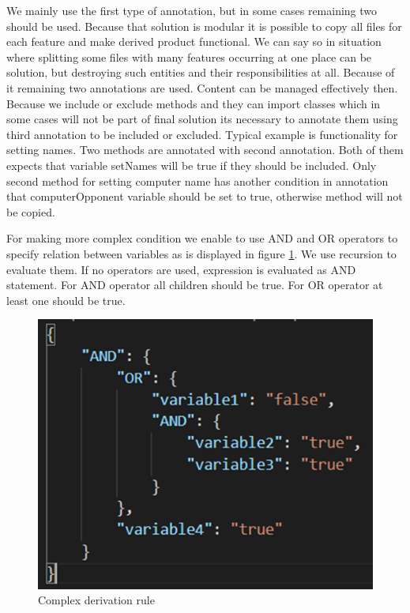 \documentclass[11pt,english,a4paper,twoside]{article}
\begin{document}
We mainly use the first type of annotation, but in some cases remaining two should be used. Because that solution is modular it is possible to copy all files for each feature and make derived product functional. We can say so in situation where splitting some files with many features occurring at one place can be solution, but destroying such entities and their responsibilities at all. Because of it remaining two annotations are used. Content can be managed effectively then. Because we include or exclude methods and they can import classes which in some cases will not be part of final solution its necessary to annotate them using third annotation to be included or excluded. Typical example is functionality for setting names. Two methods are annotated with second annotation. Both of them expects that variable setNames will be true if they should be included. Only second method for setting computer name has another condition in annotation that computerOpponent variable should be set to true, otherwise method will not be copied. 


For making more complex condition we enable to use AND and OR operators to specify relation between variables as is displayed in figure \ref{complexDerivationRule}. We use recursion to evaluate them. If no operators are used, expression is evaluated as AND statement. For AND operator all children should be true. For OR operator at least one should be true.


\begin{figure}[H]  %
					\begin{center}
									\includegraphics[width=0.65\linewidth]{fig/expresion.png}
									\caption{Complex derivation rule}
									\label{complexDerivationRule}
					\end{center}
\end{figure}
\end{document}
